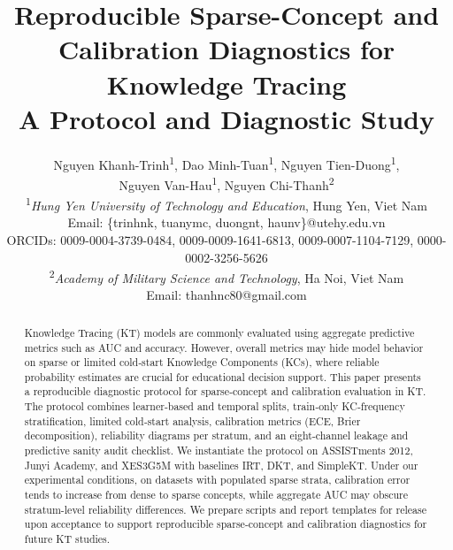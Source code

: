 \documentclass[12pt,a4paper]{article}
\begin{document}
\title{\sffamily\bfseries Reproducible Sparse-Concept and Calibration Diagnostics for Knowledge Tracing\\
{\large A Protocol and Diagnostic Study}}

\author{
\sffamily Nguyen Khanh-Trinh\textsuperscript{1}, Dao Minh-Tuan\textsuperscript{1}, Nguyen Tien-Duong\textsuperscript{1}, \\
\sffamily Nguyen Van-Hau\textsuperscript{1}, Nguyen Chi-Thanh\textsuperscript{2}\\[8pt]
\normalsize \textsuperscript{1}\textit{Hung Yen University of Technology and Education}, Hung Yen, Viet Nam\\
\normalsize Email: \{trinhnk, tuanymc, duongnt, haunv\}@utehy.edu.vn\\
\normalsize ORCIDs: 0009-0004-3739-0484, 0009-0009-1641-6813, 0009-0007-1104-7129, 0000-0002-3256-5626\\[4pt]
\normalsize \textsuperscript{2}\textit{Academy of Military Science and Technology}, Ha Noi, Viet Nam\\
\normalsize Email: thanhnc80@gmail.com
}
\date{}

\maketitle


\begin{abstract}
Knowledge Tracing (KT) models are commonly evaluated using aggregate predictive metrics such as AUC and accuracy. However, overall metrics may hide model behavior on sparse or limited cold‑start Knowledge Components (KCs), where reliable probability estimates are crucial for educational decision support. This paper presents a reproducible diagnostic protocol for sparse‑concept and calibration evaluation in KT. The protocol combines learner‑based and temporal splits, train‑only KC‑frequency stratification, limited cold‑start analysis, calibration metrics (ECE, Brier decomposition), reliability diagrams per stratum, and an eight‑channel leakage and predictive sanity audit checklist. We instantiate the protocol on ASSISTments 2012, Junyi Academy, and XES3G5M with baselines IRT, DKT, and SimpleKT. Under our experimental conditions, on datasets with populated sparse strata, calibration error tends to increase from dense to sparse concepts, while aggregate AUC may obscure stratum-level reliability differences. We prepare scripts and report templates for release upon acceptance to support reproducible sparse‑concept and calibration diagnostics for future KT studies.
\end{abstract}
\end{document}
